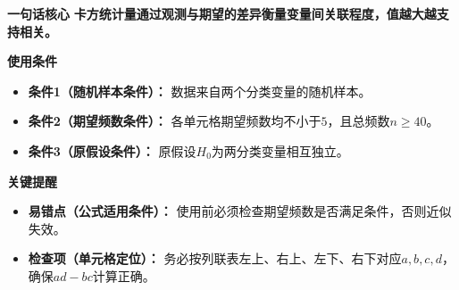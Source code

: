 \begin{summarybox}
	\textbf{\textcolor{CSummary}{一句话核心}}
	\textbf{卡方统计量通过观测与期望的差异衡量变量间关联程度，值越大越支持相关。}

	\medskip
	\textbf{\textcolor{CSummary}{使用条件}}
	\begin{itemize}[leftmargin=*, itemsep=0.5em, topsep=0.4em]
		\item \textbf{条件1（随机样本条件）：} 数据来自两个分类变量的随机样本。
		\item \textbf{条件2（期望频数条件）：} 各单元格期望频数均不小于$5$，且总频数$n\geqslant40$。
		\item \textbf{条件3（原假设条件）：} 原假设$H_0$为两分类变量相互独立。
	\end{itemize}

	\medskip
	\textbf{\textcolor{CSummary}{关键提醒}}
	\begin{itemize}[leftmargin=*, itemsep=0.5em, topsep=0.4em]
		\item \textbf{易错点（公式适用条件）：} 使用前必须检查期望频数是否满足条件，否则近似失效。
		\item \textbf{检查项（单元格定位）：} 务必按列联表左上、右上、左下、右下对应$a,b,c,d$，确保$ad-bc$计算正确。
	\end{itemize}

\end{summarybox}
